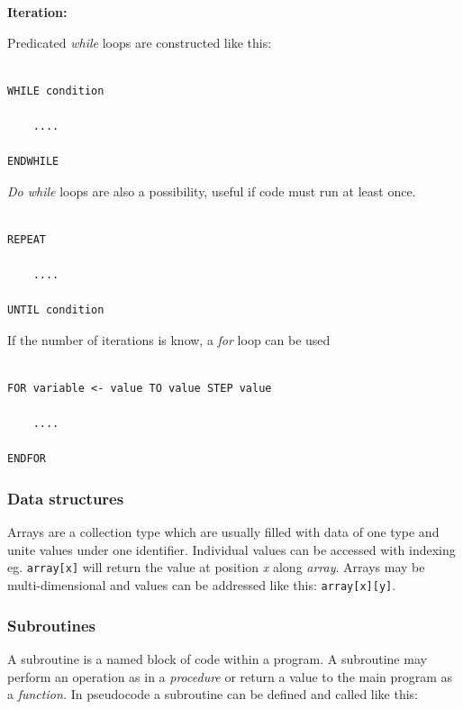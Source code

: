 \documentclass[9pt]{article}
\begin{document}
\textbf{Iteration:}

Predicated \emph{while} loops are constructed like this:

\begin{verbatim}

WHILE condition

    ....

ENDWHILE

\end{verbatim}

\emph{Do while} loops are also a possibility, useful if code must run at least once.

\begin{verbatim}

REPEAT

    ....

UNTIL condition

\end{verbatim}

If the number of iterations is know, a \emph{for} loop can be used

\begin{verbatim}

FOR variable <- value TO value STEP value

    ....

ENDFOR

\end{verbatim}

\subsubsection{Data structures}
\label{sec:org34d5744}

Arrays are a collection type which are usually filled with data of one type and unite values under one identifier. Individual values can be accessed with indexing eg. \texttt{array[x]} will return the value at position \emph{x} along \emph{array}. Arrays may be multi-dimensional and values can be addressed like this: \texttt{array[x][y]}.

\subsubsection{Subroutines}
\label{sec:org6932c3f}

A subroutine is a named block of code within a program. A subroutine may perform an operation as in a \emph{procedure} or return a value to the main program as a \emph{function.} In pseudocode a subroutine can be defined and called like this:
\end{document}
